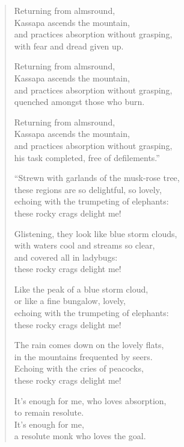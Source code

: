 \documentclass[12pt,openany]{book}%
\begin{document}
\begin{verse}
Returning from almsround, \\
Kassapa ascends the mountain, \\
and practices absorption without grasping, \\
with fear and dread given up. 

Returning from almsround, \\
Kassapa ascends the mountain, \\
and practices absorption without grasping, \\
quenched amongst those who burn. 

Returning from almsround, \\
Kassapa ascends the mountain, \\
and practices absorption without grasping, \\
his task completed, free of defilements.” 

“Strewn with garlands of the musk-rose tree, \\
these regions are so delightful, so lovely, \\
echoing with the trumpeting of elephants: \\
these rocky crags delight me! 

Glistening, they look like blue storm clouds, \\
with waters cool and streams so clear, \\
and covered all in ladybugs: \\
these rocky crags delight me! 

Like the peak of a blue storm cloud, \\
or like a fine bungalow, lovely, \\
echoing with the trumpeting of elephants: \\
these rocky crags delight me! 

The rain comes down on the lovely flats, \\
in the mountains frequented by seers. \\
Echoing with the cries of peacocks, \\
these rocky crags delight me! 

It’s enough for me, who loves absorption, \\
to remain resolute. \\
It’s enough for me, \\
a resolute monk who loves the goal. 


\end{verse}
\end{document}

